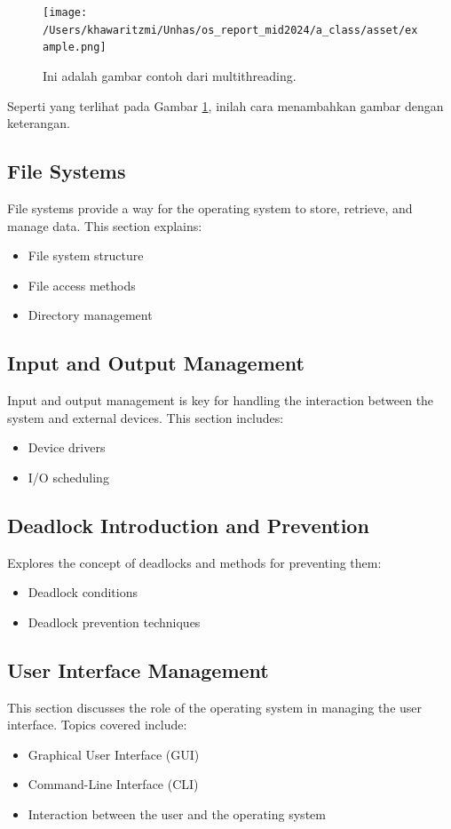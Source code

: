 \documentclass[12pt]{article}
\begin{document}
\begin{figure}[h]
    \centering
    \texttt{[image: /Users/khawaritzmi/Unhas/os\_report\_mid2024/a\_class/asset/example.png]}  %
    \caption{Ini adalah gambar contoh dari multithreading.}
    \label{fig:contoh_gambar}
\end{figure}

Seperti yang terlihat pada Gambar \ref{fig:contoh_gambar}, inilah cara menambahkan gambar dengan keterangan.

\subsection{File Systems}
File systems provide a way for the operating system to store, retrieve, and manage data. This section explains:
\begin{itemize}
    \item File system structure
    \item File access methods
    \item Directory management
\end{itemize}

\subsection{Input and Output Management}
Input and output management is key for handling the interaction between the system and external devices. This section includes:
\begin{itemize}
    \item Device drivers
    \item I/O scheduling
\end{itemize}

\subsection{Deadlock Introduction and Prevention}
Explores the concept of deadlocks and methods for preventing them:
\begin{itemize}
    \item Deadlock conditions
    \item Deadlock prevention techniques
\end{itemize}

\subsection{User Interface Management}
This section discusses the role of the operating system in managing the user interface. Topics covered include:
\begin{itemize}
    \item Graphical User Interface (GUI)
    \item Command-Line Interface (CLI)
    \item Interaction between the user and the operating system
\end{itemize}
\end{document}
